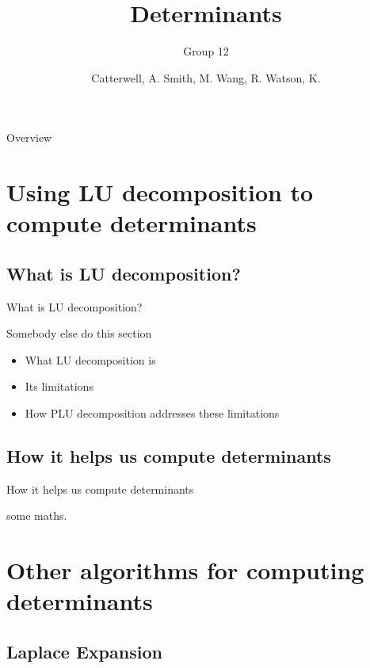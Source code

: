 \documentclass{beamer}
\title{Determinants}
\subtitle{Group 12}
\author{Catterwell, A. \quad Smith, M. \quad Wang, R. \quad Watson, K.}
\institute{University of Edinburgh}
\begin{document}
\begin{frame}
    \maketitle
\end{frame}

\begin{frame}{Overview}
    \tableofcontents
\end{frame}

\section{Using LU decomposition to compute determinants}

\subsection{What is LU decomposition?}

\begin{frame}{What is LU decomposition?}

    Somebody else do this section

    \begin{itemize}
        \item What LU decomposition is
        \item Its limitations
        \item How PLU decomposition addresses these limitations
    \end{itemize}

\end{frame}

\subsection{How it helps us compute determinants}

\begin{frame}{How it helps us compute determinants}

    some maths.

\end{frame}

\section{Other algorithms for computing determinants}

\subsection{Laplace Expansion}
\end{document}
